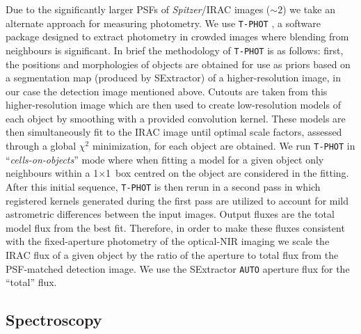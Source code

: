 \documentclass[a4paper,fleqn,usenatbib]{mnras}
\begin{document}
Due to the significantly larger PSFs of {\it Spitzer}/IRAC images ($\sim 2$\arcsec ) we take an alternate approach for measuring photometry.
We use {\tt T-PHOT} \citep{Merlin2015}, a software package designed to extract photometry in crowded images where blending from neighbours is significant.
In brief the methodology of {\tt T-PHOT} is as follows: first, the positions and morphologies of objects are obtained for use as priors based on a segmentation map (produced by SExtractor) of a higher-resolution image, in our case the detection image mentioned above.
Cutouts are taken from this higher-resolution image which are then used to create low-resolution models of each object by smoothing with a provided convolution kernel.
These models are then simultaneously fit to the IRAC image until optimal scale factors, assessed through a global $\chi^2$ minimization, for each object are obtained.
We run {\tt T-PHOT} in ``{\it cells-on-objects}'' mode where when fitting a model for a given object only neighbours within a 1$\times$1\arcmin\ box centred on the object are considered in the fitting.
After this initial sequence, {\tt T-PHOT} is then rerun in a second pass in which registered kernels generated during the first pass are utilized to account for mild astrometric differences between the input images.
Output fluxes are the total model flux from the best fit.
Therefore, in order to make these fluxes consistent with the fixed-aperture photometry of the optical-NIR imaging we scale the IRAC flux of a given object by the ratio of the aperture to total flux from the PSF-matched detection image.
We use the SExtractor {\tt AUTO} aperture flux for the ``total'' flux.


\subsection{Spectroscopy}
\label{sec:spectroscopy}
\end{document}
